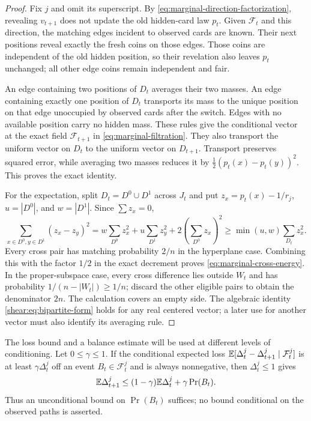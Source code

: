 \begin{proof}
Fix $j$ and omit its superscript. By
\eqref{eq:marginal-direction-factorization}, revealing $v_{t+1}$
does not update the old hidden-card law $p_t$. Given
$\mathcal F_t$ and this direction, the matching edges incident to
observed cards are known. Their next positions reveal exactly the
fresh coins on those edges. Those coins are independent of the old
hidden position, so their revelation also leaves $p_t$ unchanged;
all other edge coins remain independent and fair.

An edge containing two positions of $D_t$ averages their two
masses. An edge containing exactly one position of $D_t$ transports
its mass to the unique position on that edge unoccupied by observed
cards after the switch. Edges with no available position carry no
hidden mass. These rules give the conditional vector at the exact
field $\mathcal F_{t+1}$ in \eqref{eq:marginal-filtration}. They
also transport the uniform vector on $D_t$ to the uniform vector
on $D_{t+1}$. Transport preserves squared error, while averaging
two masses reduces it by
$\frac12(p_t(x)-p_t(y))^2$. This proves the exact identity.

For the expectation, split $D_t=D^0\cup D^1$ across $J_t$ and put
$z_x=p_t(x)-1/r_j$, $u=|D^0|$, and $w=|D^1|$. Since $\sum z_x=0$,
\begin{equation}\label{shear:eq:bipartite-form}
 \sum_{x\in D^0,y\in D^1}(z_x-z_y)^2
 =w\sum_{D^0}z_x^2+u\sum_{D^1}z_y^2
     +2\left(\sum_{D^0}z_x\right)^2
 \ge\min(u,w)\sum_{D_t}z_x^2.
\end{equation}
Every cross pair has matching probability $2/n$ in the hyperplane
case. Combining this with the factor $1/2$ in the exact decrement
proves \eqref{eq:marginal-cross-energy}. In the proper-subspace
case, every cross difference lies outside $W_t$ and has probability
$1/(n-|W_t|)\ge1/n$; discard the other eligible pairs to obtain
the denominator $2n$. The calculation covers an empty side.
The algebraic identity \eqref{shear:eq:bipartite-form} holds for
any real centered vector; a later use for another vector must also
identify its averaging rule.
\end{proof}

The loss bound and a balance estimate will be used at different
levels of conditioning. Let $0\le\gamma\le1$. If the conditional expected loss
$\mathbb E[\Delta_t^j-\Delta_{t+1}^j\mid\mathcal F_t^j]$ is at least
$\gamma\Delta_t^j$ off an event $B_t\in\mathcal F_t^j$ and is
always nonnegative, then $\Delta_t^j\le1$ gives
\begin{equation}\label{eq:marginal-balance-recurrence}
 \mathbb E\Delta_{t+1}^j
 \le(1-\gamma)\mathbb E\Delta_t^j+\gamma\Pr(B_t).
\end{equation}
Thus an unconditional bound on $\Pr(B_t)$ suffices; no bound
conditional on the observed paths is asserted.

